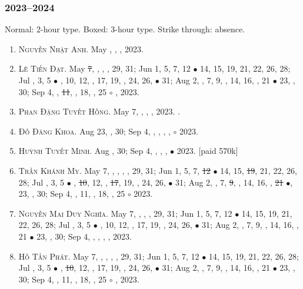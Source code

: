 \documentclass{article}
\begin{document}
\subsubsection{2023--2024}
Normal: 2-hour type. Boxed: 3-hour type. Strike through: absence.
\begin{enumerate}
	\item \textsc{Nguyễn Nhật Anh.} {\sf[In]} May , , , 2023. {\sf[Out]}
	\item \textsc{Lê Tiến Đạt.} May \st{7}, , , , 29, 31; Jun 1, 5, 7, 12 $\bullet$ 14, 15, 19, 21, 22, 26, 28; Jul , 3, 5 $\bullet$ , 10, 12, , 17, 19, , 24, 26,  $\bullet$ 31; Aug 2, , 7, 9, , 14, 16, , 21 $\bullet$ 23, , 30; Sep 4, , \st{11}, , 18, , 25 $\circ$ , 2023.
	\item \textsc{Phan Đặng Tuyết Hồng.} May 7, , , , 2023. {}. {\sf[Out]}
	\item \textsc{Đỗ Đăng Khoa.} {\sf[In]} Aug 23, , 30; Sep 4, , , , , $\circ$ 2023.
	\item \textsc{Huỳnh Tuyết Minh.} {\sf[In]} Aug , 30; Sep 4, , , ,  $\bullet$ 2023. [paid 570k]
	\item \textsc{Trần Khánh My.} May 7, , , , , 29, 31; Jun 1, 5, 7, \st{12} $\bullet$ 14, 15, \st{19}, 21, 22, 26, 28; Jul , 3, 5 $\bullet$ , \st{10}, 12, , \st{17}, 19, , 24, 26,  $\bullet$ 31; Aug 2, , 7, \st{9}, , 14, 16, , \st{21} $\bullet$, 23, , 30; Sep 4, , 11, , 18, , 25 $\circ$  2023.
	\item \textsc{Nguyễn Mai Duy Nghĩa.} May 7, , , , 29, 31; Jun 1, 5, 7, 12 $\bullet$ 14, 15, 19, 21, 22, 26, 28; Jul , 3, 5 $\bullet$ , 10, 12, , 17, 19, , 24, 26,  $\bullet$ 31; Aug 2, , 7, 9, , 14, 16, , 21 $\bullet$ 23, , 30; Sep 4, , , , , 2023.
	\item \textsc{Hồ Tấn Phát.} May 7, , , , , 29, 31; Jun 1, 5, 7, 12 $\bullet$ 14, 15, 19, 21, 22, 26, 28; Jul , 3, 5 $\bullet$ , \st{10}, 12, , 17, 19, , 24, 26,  $\bullet$ 31; Aug 2, , 7, 9, , 14, 16, , 21 $\bullet$ 23, , 30; Sep 4, , 11, , 18, , 25 $\circ$ , 2023.

\end{enumerate}
\end{document}

